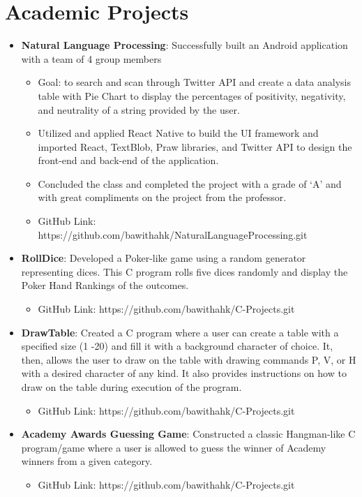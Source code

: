 \documentclass[letterpaper,11pt]{article}
\newcommand{\resumeItem}[2]{
  \item\small{
    \textbf{#1}{: #2 \vspace{-2pt}}
  }
}
\newcommand{\resumeSubItem}[2]{\resumeItem{#1}{#2}\vspace{-4pt}}
\newcommand{\resumeSubHeadingListStart}{\begin{itemize}[leftmargin=*]}
\newcommand{\resumeSubHeadingListEnd}{\end{itemize}}
\begin{document}
{\section{Academic Projects}
  \resumeSubHeadingListStart
    \resumeSubItem{Natural Language Processing}
      {Successfully built an Android application with a team of 4 group members}
    \begin{itemize}
        \item Goal: to search and scan through Twitter API and create a data analysis table with Pie Chart to display the percentages of positivity, negativity, and neutrality of a string provided by the user.
        \item Utilized and applied React Native to build the UI framework and imported React, TextBlob, Praw libraries, and Twitter API to design the front-end and back-end of the application.
        \item Concluded the class and completed the project with a grade of ‘A’ and with great compliments on the project from the professor.
        \item GitHub Link: https://github.com/bawithahk/NaturalLanguageProcessing.git
    \end{itemize}
    \resumeSubItem{RollDice}
      {Developed a Poker-like game using a random generator representing dices. This C program rolls five dices randomly and display the Poker Hand Rankings of the outcomes.}
    \begin{itemize}
        \item GitHub Link: https://github.com/bawithahk/C-Projects.git 
    \end{itemize}
    \resumeSubItem{DrawTable}
      {Created a C program where a user can create a table with a specified size (1 -20) and fill it with a background character of choice. It, then, allows the user to draw on the table with drawing commands P, V, or H with a desired character of any kind. It also provides instructions on how to draw on the table during execution of the program.}
    \begin{itemize}
        \item GitHub Link: https://github.com/bawithahk/C-Projects.git 
    \end{itemize}
    \resumeSubItem{Academy Awards Guessing Game}
     {Constructed a classic Hangman-like C program/game where a user is allowed to guess the winner of Academy winners from a given category.}
    \begin{itemize}
        \item GitHub Link: https://github.com/bawithahk/C-Projects.git 
    \end{itemize}
  \resumeSubHeadingListEnd

}
\end{document}
